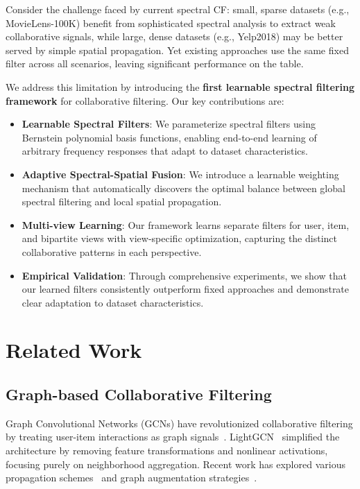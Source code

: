 \documentclass[10pt,twocolumn,letterpaper]{article}
\begin{document}
Consider the challenge faced by current spectral CF: small, sparse datasets (e.g., MovieLens-100K) benefit from sophisticated spectral analysis to extract weak collaborative signals, while large, dense datasets (e.g., Yelp2018) may be better served by simple spatial propagation. Yet existing approaches use the same fixed filter across all scenarios, leaving significant performance on the table.

We address this limitation by introducing the \textbf{first learnable spectral filtering framework} for collaborative filtering. Our key contributions are:

\begin{itemize}
    \item \textbf{Learnable Spectral Filters}: We parameterize spectral filters using Bernstein polynomial basis functions, enabling end-to-end learning of arbitrary frequency responses that adapt to dataset characteristics.
    
    \item \textbf{Adaptive Spectral-Spatial Fusion}: We introduce a learnable weighting mechanism that automatically discovers the optimal balance between global spectral filtering and local spatial propagation.
    
    \item \textbf{Multi-view Learning}: Our framework learns separate filters for user, item, and bipartite views with view-specific optimization, capturing the distinct collaborative patterns in each perspective.
    
    \item \textbf{Empirical Validation}: Through comprehensive experiments, we show that our learned filters consistently outperform fixed approaches and demonstrate clear adaptation to dataset characteristics.
\end{itemize}

\section{Related Work}

\subsection{Graph-based Collaborative Filtering}
Graph Convolutional Networks (GCNs) have revolutionized collaborative filtering by treating user-item interactions as graph signals~\cite{berg2017graph,ying2018graph}. LightGCN~\cite{he2020lightgcn} simplified the architecture by removing feature transformations and nonlinear activations, focusing purely on neighborhood aggregation. Recent work has explored various propagation schemes~\cite{wang2019neural,he2022simplifying} and graph augmentation strategies~\cite{wu2021self}.
\end{document}
